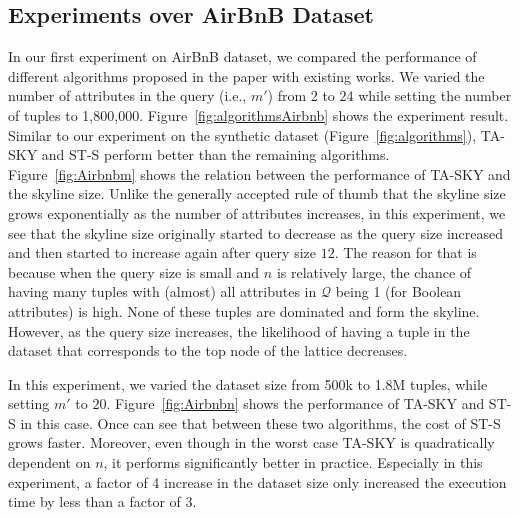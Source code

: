 \subsection{Experiments over AirBnB Dataset}\label{subsec:expAirbnb}

 In our first experiment on AirBnB dataset, we compared the performance of different algorithms proposed in the paper with existing works.
We varied the number of attributes in the query (i.e., $m'$) from $2$ to $24$ while setting the number of tuples to 1,800,000.
Figure~\ref{fig:algorithmsAirbnb} shows the experiment result.
Similar to our experiment on the synthetic dataset (Figure~\ref{fig:algorithms}), TA-SKY and ST-S perform better than the remaining algorithms.
Figure~\ref{fig:Airbnbm} shows the relation between the performance of TA-SKY and the skyline size.
Unlike the generally accepted rule of thumb that the skyline size grows exponentially as the number of attributes increases, in this experiment, we see that the skyline size originally started to decrease as the query size increased and then started to increase again after query size $12$. The reason for that is because when the query size is small and $n$ is relatively large, the chance of having many tuples with (almost) all attributes in $\mathcal{Q}$ being 1 (for Boolean attributes) is high. None of these tuples are dominated and form the skyline. However, as the query size increases, the likelihood of having a tuple in the dataset that corresponds to the top node of the lattice decreases. 

\vspace{1mm}
In this experiment, we varied the dataset size from 500k to 1.8M tuples, while setting $m'$ to $20$.
Figure~\ref{fig:Airbnbn} shows the performance of TA-SKY and ST-S in this case. Once can see that between these two algorithms, the cost of ST-S grows faster. Moreover, even though in the worst case TA-SKY is quadratically dependent on $n$, it performs significantly better in practice. Especially in this experiment, a factor of 4 increase in the dataset size only increased the execution time by less than a factor of 3. 



